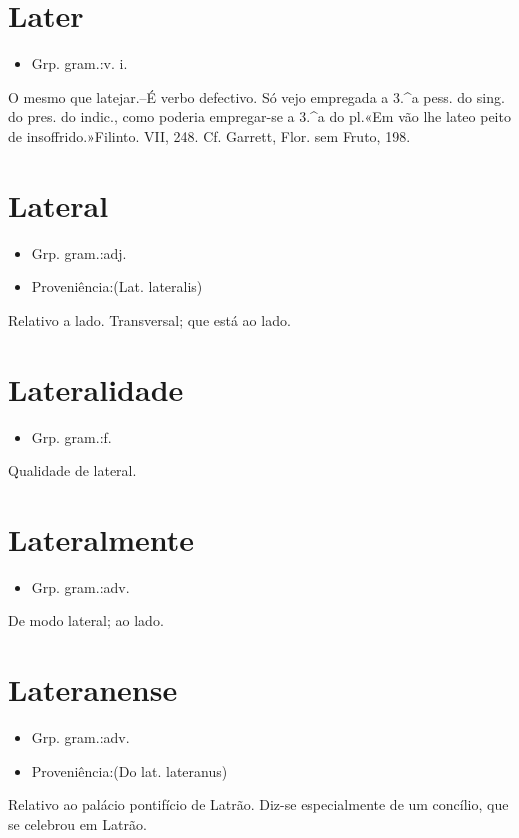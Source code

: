 \section{Later}
\begin{itemize}
\item {Grp. gram.:v. i.}
\end{itemize}
O mesmo que \textunderscore latejar\textunderscore .--É verbo defectivo. Só vejo empregada a 3.^a pess. do sing. do pres. do indic., como poderia empregar-se a 3.^a do pl.«Em vão lhe \textunderscore late\textunderscore  o peito de insoffrido.»Filinto. VII, 248. Cf. Garrett, \textunderscore Flor. sem Fruto\textunderscore , 198.
\section{Lateral}
\begin{itemize}
\item {Grp. gram.:adj.}
\end{itemize}
\begin{itemize}
\item {Proveniência:(Lat. \textunderscore lateralis\textunderscore )}
\end{itemize}
Relativo a lado.
Transversal; que está ao lado.
\section{Lateralidade}
\begin{itemize}
\item {Grp. gram.:f.}
\end{itemize}
Qualidade de lateral.
\section{Lateralmente}
\begin{itemize}
\item {Grp. gram.:adv.}
\end{itemize}
De modo lateral; ao lado.
\section{Lateranense}
\begin{itemize}
\item {Grp. gram.:adv.}
\end{itemize}
\begin{itemize}
\item {Proveniência:(Do lat. \textunderscore lateranus\textunderscore )}
\end{itemize}
Relativo ao palácio pontifício de Latrão.
Diz-se especialmente de um concílio, que se celebrou em Latrão.
